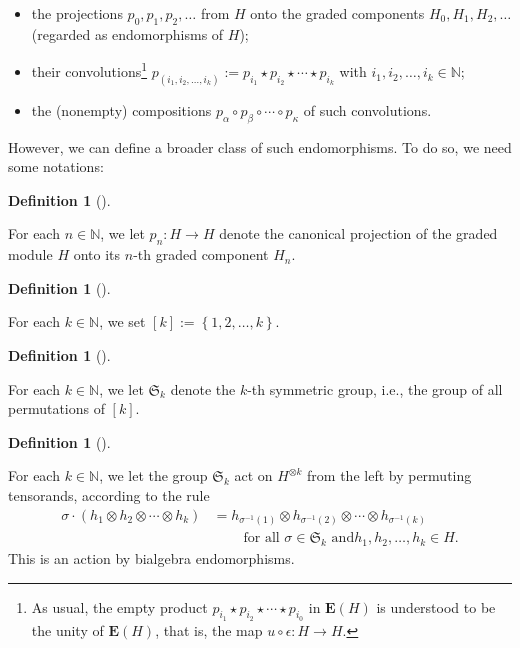 \documentclass[numbers=enddot,12pt,final,onecolumn,notitlepage]{scrartcl}%
\theoremstyle{definition}
\newtheorem{defi}[theo]{Definition}
\newenvironment{definition}[1][]
{\begin{defi}[#1]\begin{leftbar}}
{\end{leftbar}\end{defi}}
\begin{document}
\begin{itemize}
\item the projections $p_{0},p_{1},p_{2},\ldots$ from $H$ onto the graded
components $H_{0},H_{1},H_{2},\ldots$ (regarded as endomorphisms of $H$);

\item their convolutions\footnote{As usual, the empty product $p_{i_{1}}\star
p_{i_{2}}\star\cdots\star p_{i_{0}}$ in $\mathbf{E}\left(  H\right)  $ is
understood to be the unity of $\mathbf{E}\left(  H\right)  $, that is, the map
$u\circ\epsilon:H\rightarrow H$.} $p_{\left(  i_{1},i_{2},\ldots,i_{k}\right)
}:=p_{i_{1}}\star p_{i_{2}}\star\cdots\star p_{i_{k}}$ with $i_{1}%
,i_{2},\ldots,i_{k}\in\mathbb{N}$;

\item the (nonempty) compositions $p_{\alpha}\circ p_{\beta}\circ\cdots\circ
p_{\kappa}$ of such convolutions.
\end{itemize}

However, we can define a broader class of such endomorphisms. To do so, we
need some notations:

\begin{definition}
For each $n\in\mathbb{N}$, we let $p_{n}:H\rightarrow H$ denote the canonical
projection of the graded module $H$ onto its $n$-th graded component $H_{n}$.
\end{definition}

\begin{definition}
For each $k\in\mathbb{N}$, we set $\left[  k\right]  :=\left\{  1,2,\ldots
,k\right\}  $.
\end{definition}

\begin{definition}
For each $k\in\mathbb{N}$, we let $\mathfrak{S}_{k}$ denote the $k$-th
symmetric group, i.e., the group of all permutations of $\left[  k\right]  $.
\end{definition}

\begin{definition}
\label{def.Sk-action}For each $k\in\mathbb{N}$, we let the group
$\mathfrak{S}_{k}$ act on $H^{\otimes k}$ from the left by permuting
tensorands, according to the rule%
\begin{align*}
\sigma\cdot\left(  h_{1}\otimes h_{2}\otimes\cdots\otimes h_{k}\right)   &
=h_{\sigma^{-1}\left(  1\right)  }\otimes h_{\sigma^{-1}\left(  2\right)
}\otimes\cdots\otimes h_{\sigma^{-1}\left(  k\right)  }\\
&  \ \ \ \ \ \ \ \ \ \ \text{for all }\sigma\in\mathfrak{S}_{k}\text{ and
}h_{1},h_{2},\ldots,h_{k}\in H.
\end{align*}
This is an action by bialgebra endomorphisms.
\end{definition}
\end{document}
